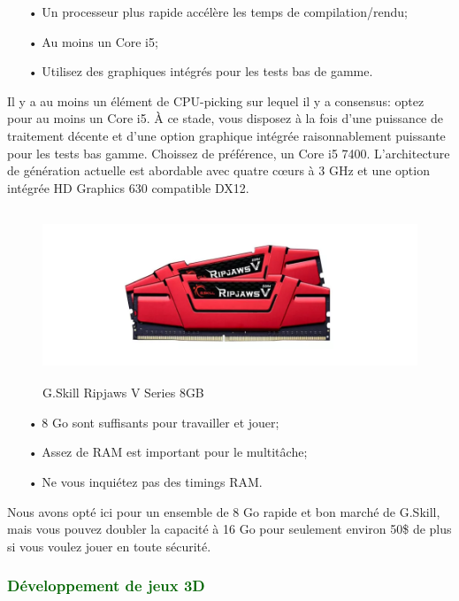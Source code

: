 \documentclass[ebook, 8pt, oneside, openany]{memoir}
\begin{document}
	\begin{itemize}
		\item[• Un processeur plus rapide accélère les temps de compilation/rendu;]
		\item[• Au moins un Core i5;]
		\item[• Utilisez des graphiques intégrés pour les tests bas de gamme.]
	\end{itemize}
	Il y a au moins un élément de CPU-picking sur lequel il y a consensus: optez pour au moins un Core i5. À
	ce stade, vous disposez à la fois d'une puissance de traitement décente et d'une option graphique
	intégrée raisonnablement puissante pour les tests bas gamme. Choissez de préférence, un Core i5 7400.
	L'architecture de génération actuelle est abordable avec quatre cœurs à 3 GHz et une option intégrée HD
	Graphics 630 compatible DX12.
	\begin{figure}[h]
		\begin{center}\includegraphics[height = 145pt]{2d_memory_ram.png}\end{center}
		\caption{G.Skill Ripjaws V Series 8GB}
		\label{G.Skill Ripjaws V Series 8GB}
	\end{figure}
	\begin{itemize}
		\item[• 8 Go sont suffisants pour travailler et jouer;]
		\item[• Assez de RAM est important pour le multitâche;]
		\item[• Ne vous inquiétez pas des timings RAM.]
	\end{itemize}
	Nous avons opté ici pour un ensemble de 8 Go rapide et bon marché de G.Skill, mais vous pouvez doubler
	la capacité à 16 Go pour seulement environ 50\$ de plus si vous voulez jouer en toute sécurité.
	\newpage \subsubsection{\textcolor{darkgreen}{Développement de jeux 3D}}
\end{document}
